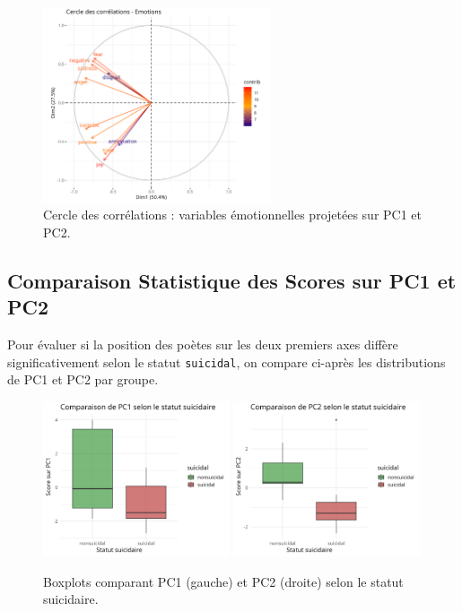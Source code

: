 \documentclass[12pt,a4paper]{article}
\begin{document}
\begin{figure}[htbp]
	\centering
	\includegraphics[width=0.6\textwidth]{04_correlations_circle.png}
	\caption{Cercle des corrélations : variables émotionnelles projetées sur PC1 et PC2.}
	\label{fig:pca_vars}
\end{figure}

\subsection{Comparaison Statistique des Scores sur PC1 et PC2}
\label{subsec:test_pc}
Pour évaluer si la position des poètes sur les deux premiers axes 
diffère significativement selon le statut \texttt{suicidal}, 
on compare ci-après les distributions de PC1 et PC2 par groupe.

\begin{figure}[htbp]
	\centering
	\includegraphics[width=0.49\textwidth]{05_boxplot_PC1.png}
	\hfill
	\includegraphics[width=0.49\textwidth]{06_boxplot_PC2.png}
	\caption{Boxplots comparant PC1 (gauche) et PC2 (droite) selon le statut suicidaire.}
	\label{fig:boxplots_pc1_pc2}
\end{figure}
\end{document}
